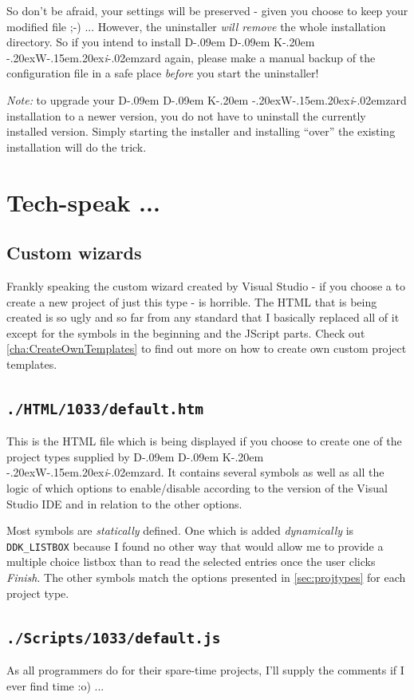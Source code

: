 \documentclass[a4paper,titlepage]{report}
\def\ddkwiz{\texorpdfstring{D\kern-.09em D\kern-.09em K\kern-.20em \raise-.20ex\hbox{W}\kern-.15em\raise.20ex\hbox{\it{i}}\kern-.02em{zard}}{DDKWizard}}
\begin{document}
So don't be afraid, your settings will be preserved - given you choose to keep your
modified file \textsf{;-)} ... However, the uninstaller \emph{will remove} the whole installation
directory. So if you intend to install \ddkwiz{} again, please make a manual backup of the
configuration file in a safe place \emph{before} you start the uninstaller!

\emph{Note:} to upgrade your \ddkwiz{} installation to a newer version, you do
not have to uninstall the currently installed version. Simply starting the installer
and installing ``over'' the existing installation will do the trick.

\chapter{Tech-speak ...}\thispagestyle{fancy}
\section{Custom wizards}
Frankly speaking the custom wizard created by Visual Studio - if you choose a to create
a new project of just this type - is horrible. The HTML that is being created is so
ugly and so far from any standard that I basically replaced all of it except for the
symbols in the beginning and the JScript parts. Check out \autoref{cha:CreateOwnTemplates}
to find out more on how to create own custom project templates.

\section{\texttt{./HTML/1033/default.htm}}
This is the HTML file which is being displayed if you choose to create one of
the project types supplied by \ddkwiz{}. It contains several symbols as well as
all the logic of which options to enable/disable according to the version of the
Visual Studio IDE and in relation to the other options.

Most symbols are \emph{statically} defined. One which is added
\emph{dynamically} is \verb+DDK_LISTBOX+ because I found no other way that
would allow me to provide a multiple choice listbox than to read the selected
entries once the user clicks \emph{Finish}. The other symbols match
the options presented in \autoref{sec:projtypes} for each project type.

\section{\texttt{./Scripts/1033/default.js}}
As all programmers do for their spare-time projects, I'll supply the comments
if I ever find time \textsf{:o)} ...
\end{document}
